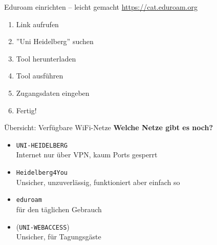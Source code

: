 \begin{frame}{Eduroam einrichten -- leicht gemacht}
    \large \url{https://cat.eduroam.org} \\
    \begin{minipage}[t]{0.515\textwidth}
        \begin{enumerate}
            \item<+-> Link aufrufen
            \item<+-> ''Uni Heidelberg'' suchen
            \item<+-> Tool herunterladen
            \item<+-> Tool ausführen
            \item<+-> Zugangsdaten eingeben
            \item<+-> Fertig!
        \end{enumerate}
    \end{minipage}
    \begin{minipage}[t]{0.4\textwidth}
        \vspace{0cm}
        \begin{center}
        \end{center}
    \end{minipage}
\end{frame}


\begin{frame}{Übersicht: Verfügbare WiFi-Netze}
    \large \textbf{Welche Netze gibt es noch?}
    \normalsize
    \begin{itemize}
        \item \texttt{UNI-HEIDELBERG} \\
            Internet nur über VPN, kaum Ports gesperrt
        \item \texttt{Heidelberg4You} \\
            Unsicher, unzuverlässig, funktioniert aber einfach so
        \item \texttt{eduroam} \\
            für den täglichen Gebrauch
        \item (\texttt{UNI-WEBACCESS}) \\
            Unsicher, für Tagungsgäste
    \end{itemize}
\end{frame}


